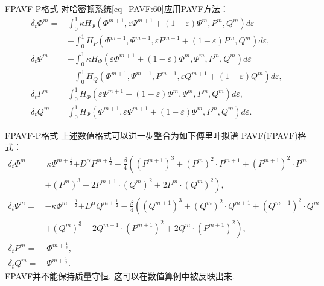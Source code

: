 \documentclass[aspectratio=169]{beamer}
\numberwithin{theorem}{section} %
\numberwithin{equation}{section}%
\numberwithin{figure}{section}%
\numberwithin{table}{section}%
\begin{document}
\begin{frame}{FPAVF-P格式}
	对哈密顿系统\eqref{eq_PAVF:60}应用PAVF方法：
	{\small\begin{align}
	\delta_{t} \varPhi^{m}=&\int_{0}^{1}\kappa H_{\Psi}\left(\varPhi^{m+1}, \varepsilon \Psi^{m+1}+(1-\varepsilon) \Psi^{m}, P^{m}, Q^{m}\right)d \varepsilon\nonumber\\
	&-\int_{0}^{1}H_{P}\left(\varPhi^{m+1}, \Psi^{m+1}, \varepsilon P^{m+1}+(1-\varepsilon) P^{m}, Q^{m}\right)d \varepsilon,\label{eq_PAVF:70}\\
	\delta_{t} \Psi^{m}=&-\int_{0}^{1}\kappa H_{\varPhi}\left(\varepsilon \varPhi^{m+1}+(1-\varepsilon) \varPhi^{m}, \Psi^{m}, P^{m}, Q^{m}\right)d \varepsilon\nonumber\\
	&+\int_{0}^{1}H_{Q}\left(\varPhi^{m+1}, \Psi^{m+1}, P^{m+1}, \varepsilon Q^{m+1}+(1-\varepsilon) Q^{m}\right)d\varepsilon,\label{eq_PAVF:71}\\
	\delta_{t} P^{m}=&\int_{0}^{1}H_{\varPhi}\left(\varepsilon \varPhi^{m+1}+(1-\varepsilon) \varPhi^{m}, \Psi^{m}, P^{m}, Q^{m}\right) d \varepsilon,\label{eq_PAVF:72}\\
	\delta_{t} Q^{m}=&\int_{0}^{1}H_{\Psi}\left(\varPhi^{m+1}, \varepsilon \Psi^{m+1}+(1-\varepsilon) \Psi^{m}, P^{m}, Q^{m}\right) d \varepsilon.\label{eq_PAVF:73}
	\end{align}}
\end{frame}

\begin{frame}{FPAVF-P格式}
	上述数值格式可以进一步整合为如下傅里叶拟谱 PAVF(FPAVF)格式：
	{\small\begin{align}
	\delta_{t} \varPhi^{m}=&~\kappa \Psi^{m+\frac{1}{2}}{+D^{\alpha} P^{m+\frac{1}{2}}}-\frac{\beta}{4}\left( (P^{m+1})^3+ (P^{m})^{2}\cdot P^{m+1}+(P^{m+1})^{2}\cdot P^{m}\right.\nonumber\\
		&+\left. (P^{m})^{3}+2 P^{m+1}\cdot (Q^{m})^{2}+2 P^{m}\cdot (Q^{m})^{2}\right),\label{eq_PAVF:74}\\
	\delta_{t} \Psi^{m}=&-\kappa \varPhi^{m+\frac{1}{2}}{+D^{\alpha} Q^{m+\frac{1}{2}}}-\frac{\beta}{4}\left( (Q^{m+1})^3+ (Q^{m})^{2}\cdot Q^{m+1}+(Q^{m+1})^{2}\cdot Q^{m}\right.\nonumber\\
		&+\left. (Q^{m})^{3}+2 Q^{m+1}\cdot (P^{m+1})^{2}+2 Q^{m}\cdot (P^{m+1})^{2}\right),\label{eq_PAVF:75}\\
	\delta_{t} P^{m}=&~\varPhi^{m+\frac{1}{2}},\label{eq_PAVF:76}\\
	\delta_{t} Q^{m}=&~\Psi^{m+\frac{1}{2}}.\label{eq_PAVF:77}
	\end{align}}
	{\color{purple}FPAVF并不能保持质量守恒,} 这可以在数值算例中被反映出来.
\end{frame}
\end{document}
